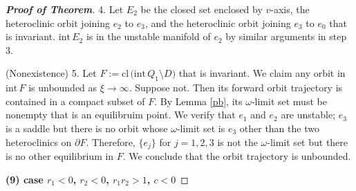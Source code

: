 \documentclass{amsart}
\theoremstyle{definition}
\numberwithin{equation}{section}
\def\ii{{\textrm{int}}\,}
\def\cl{{\textrm{cl}}\,}
\begin{document}
\begin{proof}[\textbf{Proof of Theorem}]
4. Let $E_2$ be the closed set enclosed by $v$-axis, the heteroclinic orbit joining $e_2$ to $e_3$, and the heteroclinic orbit joining $e_3$ to $e_0$ that is invariant. $\ii E_2$ is in the unstable manifold of $e_2$ by similar arguments in step 3. 

(Nonexistence) 5. Let $F:= \cl\big(\ii Q_1 \setminus D\big)$ that is invariant. We claim any orbit in $\ii F$ is unbounded as $\xi \rightarrow \infty$. Suppose not. Then its forward orbit trajectory is contained in a compact subset of $F$. By Lemma \ref{pb}, its $\omega$-limit set must be nonempty that is an equilibruim point. We verify that $e_1$ and $e_2$ are unstable; $e_3$ is a saddle but there is no orbit whose $\omega$-limit set is $e_3$ other than the two heteroclinics on $\partial F$. Therefore, $\{e_j\}$ for $j=1,2,3$ is not the $\omega$-limit set but there is no other equilibrium in $F$. We conclude that the orbit trajectory is unbounded.

\bigskip


\textbf{(9) \boldmath case $r_1<0$, $r_2<0$, $r_1r_2>1$, $c<0$}


\end{proof}
\end{document}
